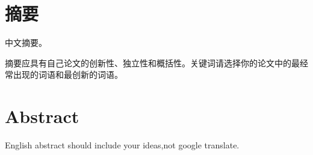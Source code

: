 
\chapter*{摘要}

中文摘要。

摘要应具有自己论文的创新性、独立性和概括性。关键词请选择你的论文中的最经常出现的词语和最创新的词语。

	
	

\clearpage

\chapter*{Abstract}

English abstract should include your ideas,not google translate.


\cleardoublepage